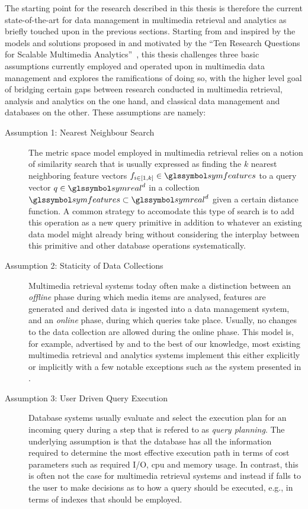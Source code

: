The starting point for the research described in this thesis is therefore the current state-of-the-art for data management in multimedia retrieval and analytics as briefly touched upon in the previous sections. Starting from and inspired by the models and solutions proposed in \cite{Giangreco:2016Adam,Giangreco:2018Database} and motivated by the ``Ten Research Questions for Scalable Multimedia Analytics''~\cite{Jonson:2016Ten}, this thesis challenges three basic assumptions currently employed and operated upon in multimedia data management and explores the ramifications of doing so, with the higher level goal of bridging certain gaps between research conducted in multimedia retrieval, analysis and analytics on the one hand, and classical data management and databases on the other. These assumptions are namely:

\begin{description}
    \item[Assumption 1: Nearest Neighbour Search] The metric space model employed in multimedia retrieval \cite{Zezula:2006Similarity} relies on a notion of similarity search that is usually expressed as finding the $k$ nearest neighboring feature vectors $f_{i \in \left[1,k\right]} \in \symfeatures$ to a query vector $q \in \symreal^d$ in a collection $\symfeatures \subset \symreal^d$ given a certain distance function. A common strategy to accomodate this type of search is to add this operation as a new query primitive in addition to whatever an existing data model might already bring \cite{Guliato:2009PostgreSQL,Giangreco:2016Adam,Yang:2020Pase} without considering the interplay between this primitive and other database operations systematically.

    \item[Assumption 2: Staticity of Data Collections] Multimedia retrieval systems today often make a distinction between an \emph{offline} phase during which media items are analysed, features are generated and derived data is ingested into a data management system, and an \emph{online} phase, during which queries take place. Usually, no changes to the data collection are allowed during the online phase. This model is, for example, advertised by \cite{Flickner:1995Query,Kiranyaz:2003Muvis,Giangreco:2018Database,Rossetto:2018Multi} and to the best of our knowledge, most existing multimedia retrieval and analytics systems implement this either explicitly or implicitly with a few notable exceptions such as the system presented in \cite{Wang:2021Milvus}.

    \item[Assumption 3: User Driven Query Execution] Database systems usually evaluate and select the execution plan for an incoming query during a step that is refered to as \emph{query planning}. The underlying assumption is that the database has all the information required to determine the most effective execution path in terms of cost parameters such as required I/O, \acrshort{cpu} and memory usage. In contrast, this is often not the case for multimedia retrieval systems and instead if falls to the user to make decisions as to how a query should be executed, e.g., in terms of indexes that should be employed.
\end{description}

